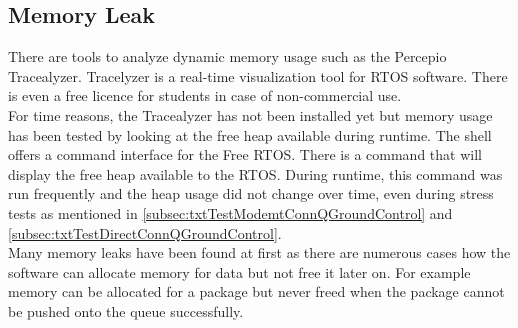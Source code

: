 \subsection{Memory Leak}
There are tools to analyze dynamic memory usage such as the Percepio Tracealyzer. Tracelyzer is a real-time visualization tool for RTOS software. There is even a free licence for students in case of non-commercial use.\\
For time reasons, the Tracealyzer has not been installed yet but memory usage has been tested by looking at the free heap available during runtime. The shell offers a command interface for the Free RTOS. There is a command that will display the free heap available to the RTOS. During runtime, this command was run frequently and the heap usage did not change over time, even during stress tests as mentioned in \autoref{subsec:txtTestModemtConnQGroundControl} and \autoref{subsec:txtTestDirectConnQGroundControl}.\\
Many memory leaks have been found at first as there are numerous cases how the software can allocate memory for data but not free it later on. For example memory can be allocated for a package but never freed when the package cannot be pushed onto the queue successfully.